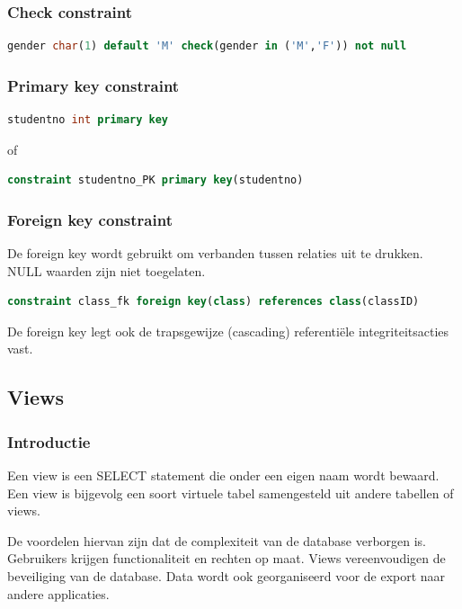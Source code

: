 \documentclass[a4paper,12pt]{article}
\begin{document}
\subsubsection{Check constraint}
\begin{lstlisting}[language=sql, breaklines=true]
gender char(1) default 'M' check(gender in ('M','F')) not null
\end{lstlisting}

\subsubsection{Primary key constraint}
\begin{lstlisting}[language=sql, breaklines=true]
studentno int primary key
\end{lstlisting}

of

\begin{lstlisting}[language=sql, breaklines=true]
constraint studentno_PK primary key(studentno)
\end{lstlisting}

\subsubsection{Foreign key constraint}
De foreign key wordt gebruikt om verbanden tussen relaties uit te drukken. NULL waarden zijn niet toegelaten.
\begin{lstlisting}[language=sql, breaklines=true]
constraint class_fk foreign key(class) references class(classID)
\end{lstlisting}
De foreign key legt ook de trapsgewijze (cascading) referentiële integriteitsacties vast.

\subsection{Views}
\subsubsection{Introductie}
Een view is een SELECT statement die onder een eigen naam wordt bewaard.
Een view is bijgevolg een soort virtuele tabel samengesteld uit andere tabellen of views.

De voordelen hiervan zijn dat de complexiteit van de database verborgen is.
Gebruikers krijgen functionaliteit en rechten op maat.
Views vereenvoudigen de beveiliging van de database.
Data wordt ook georganiseerd voor de export naar andere applicaties.
\end{document}
